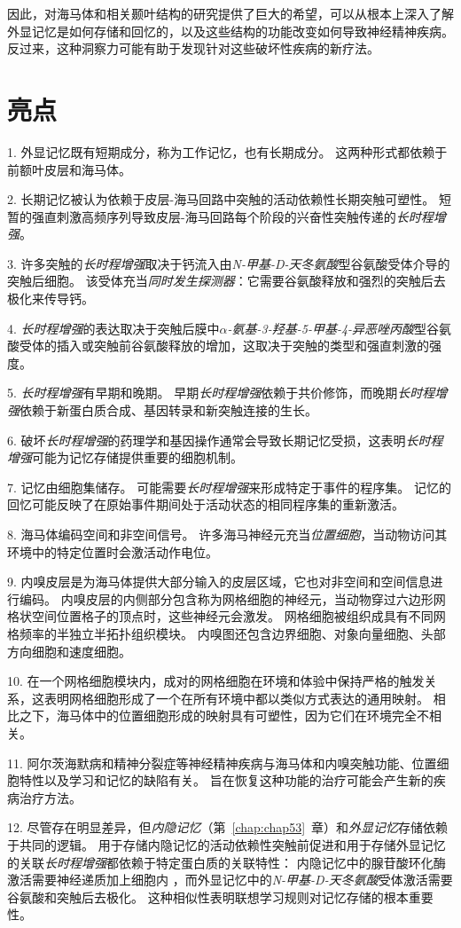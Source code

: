 因此，对海马体和相关颞叶结构的研究提供了巨大的希望，可以从根本上深入了解外显记忆是如何存储和回忆的，以及这些结构的功能改变如何导致神经精神疾病。
反过来，这种洞察力可能有助于发现针对这些破坏性疾病的新疗法。



\section{亮点}

1. 外显记忆既有短期成分，称为工作记忆，也有长期成分。
这两种形式都依赖于前额叶皮层和海马体。 


2. 长期记忆被认为依赖于皮层-海马回路中突触的活动依赖性长期突触可塑性。
短暂的强直刺激高频序列导致皮层-海马回路每个阶段的兴奋性突触传递的\textit{长时程增强}。


3. 许多突触的\textit{长时程增强}取决于钙流入由\textit{N-甲基-D-天冬氨酸}型谷氨酸受体介导的突触后细胞。
该受体充当\textit{同时发生探测器}：它需要谷氨酸释放和强烈的突触后去极化来传导钙。 


4. \textit{长时程增强}的表达取决于突触后膜中\textit{$\alpha$-氨基-3-羟基-5-甲基-4-异恶唑丙酸}型谷氨酸受体的插入或突触前谷氨酸释放的增加，这取决于突触的类型和强直刺激的强度。


5. \textit{长时程增强}有早期和晚期。
早期\textit{长时程增强}依赖于共价修饰，而晚期\textit{长时程增强}依赖于新蛋白质合成、基因转录和新突触连接的生长。


6. 破坏\textit{长时程增强}的药理学和基因操作通常会导致长期记忆受损，这表明\textit{长时程增强}可能为记忆存储提供重要的细胞机制。


7. 记忆由细胞集储存。
可能需要\textit{长时程增强}来形成特定于事件的程序集。
记忆的回忆可能反映了在原始事件期间处于活动状态的相同程序集的重新激活。


8. 海马体编码空间和非空间信号。
许多海马神经元充当\textit{位置细胞}，当动物访问其环境中的特定位置时会激活动作电位。


9. 内嗅皮层是为海马体提供大部分输入的皮层区域，它也对非空间和空间信息进行编码。
内嗅皮层的内侧部分包含称为网格细胞的神经元，当动物穿过六边形网格状空间位置格子的顶点时，这些神经元会激发。
网格细胞被组织成具有不同网格频率的半独立半拓扑组织模块。
内嗅图还包含边界细胞、对象向量细胞、头部方向细胞和速度细胞。


10. 在一个网格细胞模块内，成对的网格细胞在环境和体验中保持严格的触发关系，这表明网格细胞形成了一个在所有环境中都以类似方式表达的通用映射。
相比之下，海马体中的位置细胞形成的映射具有可塑性，因为它们在环境完全不相关。


11. 阿尔茨海默病和精神分裂症等神经精神疾病与海马体和内嗅突触功能、位置细胞特性以及学习和记忆的缺陷有关。
旨在恢复这种功能的治疗可能会产生新的疾病治疗方法。 


12. 尽管存在明显差异，但\textit{内隐记忆}（第~\ref{chap:chap53}~章）和\textit{外显记忆}存储依赖于共同的逻辑。
用于存储内隐记忆的活动依赖性突触前促进和用于存储外显记忆的关联\textit{长时程增强}都依赖于特定蛋白质的关联特性：
内隐记忆中的腺苷酸环化酶激活需要神经递质加上细胞内 ，而外显记忆中的\textit{N-甲基-D-天冬氨酸}受体激活需要谷氨酸和突触后去极化。
这种相似性表明联想学习规则对记忆存储的根本重要性。






